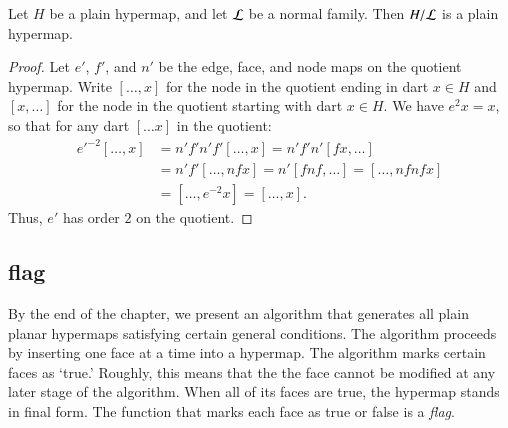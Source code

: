 \begin{lemma}
Let $H$ be a plain hypermap, and let $\cal L$ be a
normal family.  Then $H/{\cal L}$ is a plain hypermap.
\end{lemma}

\begin{proof} Let $e'$, $f'$, and $n'$ be the edge, face, and node maps on the
quotient hypermap.  Write $[\ldots, x]$ for the node in the quotient
ending in dart $x\in H$ and $[x,\ldots]$ for the node in the quotient
starting with dart $x\in H$.  We have $e^2 x = x$, so that for any
dart $[\ldots x]$ in the quotient:
    $$\begin{array}{lll}
    {e'}^{-2} [\ldots, x] &= n' f' n' f' [\ldots, x] = n' f' n' [f x, \ldots] \\&=
    n' f' [\ldots, n f x] = n' [f n f, \ldots] = [\ldots, n f n f x]\\ &=
    [\ldots, e^{-2} x] = [\ldots, x].
    \end{array}$$
Thus, $e'$ has order $2$ on the quotient.
\end{proof}

%


\subsection{flag}

By the end of the chapter, we present an algorithm that
generates all plain planar hypermaps satisfying certain general
conditions.   The algorithm  proceeds by inserting one face
at a time into a hypermap.  
The algorithm  marks certain faces as `true.'
Roughly, this  means that the the face cannot be modified
at any later stage of the algorithm.   When all of its faces
are true, the hypermap stands in final form.
The function that marks each face as true or false is a
{\it flag}.



